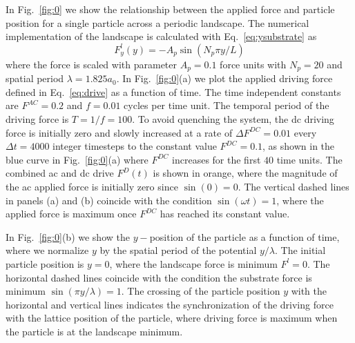 \documentclass[twocolumn,preprintnumbers,amsmath,amssymb,aps,prx]{revtex4}
\begin{document}
In Fig.~\ref{fig:0} we
show the relationship between the applied force and particle
position %
for 
a single particle across a periodic landscape. 
%
The numerical implementation of the landscape 
is calculated with Eq.~\ref{eq:ysubstrate} as 
\begin{equation}
  \label{eq:force}
  F^l_y(y) = -A_{p} \sin{(N_p \pi y / L)} 
\end{equation}
where the force is scaled with parameter $A_{p} = 0.1$ force units 
with $N_p=20$ %
and spatial period $\lambda = 1.825 a_0$.
%
In Fig.~\ref{fig:0}(a)
we plot the applied driving force defined in Eq.~\ref{eq:drive}
as a function of time.
The time independent constants are 
$F^{AC}=0.2$ and $f=0.01$ cycles per time unit.
The temporal period of the driving force is
$T = 1/f = 100$.
To avoid quenching the system, 
the dc driving force is initially zero   
and 
slowly increased %
at a rate of $\Delta F^{DC} = 0.01$ every $\Delta t = 4000$ integer timesteps 
to the constant value $F^{DC}=0.1$,
as shown in the blue curve in Fig.~\ref{fig:0}(a)
where $F^{DC}$ increases for the first $40$ time units.
The combined ac and dc drive $F^D(t)$ is shown in orange,
where 
the magnitude of the ac applied force is initially zero
since $\sin{(0)}=0$.
The vertical dashed lines in panels (a) and (b) coincide
with the condition $\sin{(\omega t)} = 1$,
where the applied force is maximum once $F^{DC}$ has reached its constant value.



In Fig.~\ref{fig:0}(b) 
we show the $y-$position of the particle
as a function of time,
where we 
normalize $y$ by the spatial period of the potential %
$y/\lambda$.
The initial particle position is $y=0$,
where the landscape force is minimum $F^l = 0$.
The horizontal dashed lines
coincide with the condition the substrate force is
minimum 
$\sin{(\pi y / \lambda)} = 1 $. 
The crossing of the particle position $y$
with the horizontal and vertical lines
indicates the synchronization
of the driving force with the lattice position of the particle,
where driving force is maximum when the particle
is at the landscape minimum.
\end{document}
